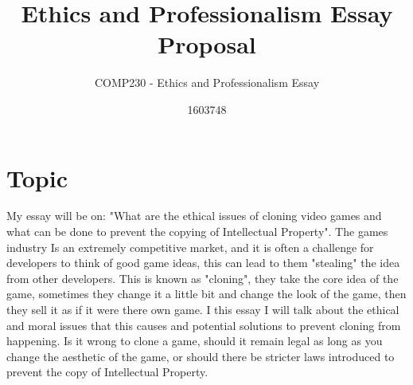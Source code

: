 \documentclass{scrartcl}
\title{Ethics and Professionalism Essay Proposal}
\subtitle{COMP230 - Ethics and Professionalism Essay}
\author{1603748}
\begin{document}
\maketitle

\section*{Topic}

My essay will be on: "What are the ethical issues of cloning video games and what can be done to prevent the copying of Intellectual Property". The games industry Is an extremely competitive market, and it is often a challenge for developers to think of good game ideas, this can lead to them "stealing" the idea from other developers. This is known as "cloning", they take the core idea of the game, sometimes they change it a little bit and change the look of the game, then they sell it as if it were there own game. I this essay I will talk about the ethical and moral issues that this causes and potential solutions to prevent cloning from happening. Is it wrong to clone a game, should it remain legal as long as you change the aesthetic of the game, or should there be stricter laws introduced to prevent the copy of Intellectual Property. 

\end{document}
